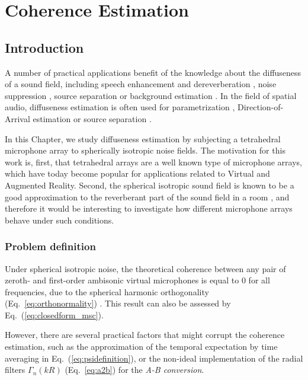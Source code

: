 \chapter{Coherence Estimation}
\label{chap:coherence}


\section{Introduction}

A number of practical applications benefit of the knowledge about the diffuseness of a sound field, including speech enhancement and dereverberation \cite{p_habets_dual-microphone_2006}, noise suppression \cite{ito_designing_2010}, source separation \cite{duong_under-determined_2009} or background estimation \cite{stefanakis_foreground_2015}. In the field of spatial audio, diffuseness estimation is often used for parametrization \cite{pulkki2006directional, politis_compass_2018}, Direction-of-Arrival estimation \cite{thiergart_localization_2009} or source separation \cite{motlicek_real-time_2013}.

In this Chapter, we study diffuseness estimation by subjecting a tetrahedral microphone array to spherically isotropic noise fields.
The motivation for this work is, first, that tetrahedral arrays are a well known type of microphone arrays, which have today become popular for applications related to Virtual and Augmented Reality. 
Second, the spherical isotropic sound field is known to be a good approximation to the reverberant part of the sound field in a room \cite{elko_spatial_2001, mccowan_microphone_2003}, and therefore it would be interesting to investigate how different microphone arrays behave under such conditions.




\subsection{Problem definition}

Under spherical isotropic noise, the theoretical coherence between any pair of zeroth- and first-order ambisonic virtual microphones is equal to 0 for all frequencies, due to the spherical harmonic orthogonality (Eq.~\ref{eq:orthonormality}) \cite{elko_spatial_2001}. This result can also be assessed by Eq.~(\ref{eq:closedform_msc}).

However, there are several practical factors that might corrupt the coherence estimation, such as the approximation of the temporal expectation by time averaging \cite{thiergart_diffuseness_2011} in Eq.~(\ref{eq:psidefinition}), or the non-ideal implementation of the radial filters $\Gamma_n(kR)$ (Eq.~\ref{eq:a2b}) for the \textit{A-B conversion}\cite{schorkhuber_ambisonic_2017}.

